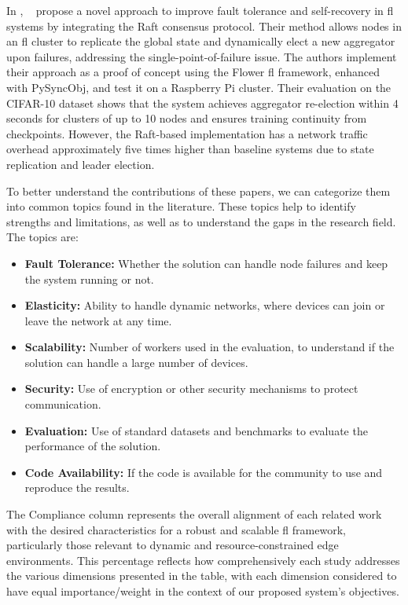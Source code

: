 In \cite{Dautov2024110}, ~\citeauthor{Dautov2024110} propose a novel approach to improve fault tolerance and self-recovery in \ac{fl} systems by integrating the Raft consensus protocol. Their method allows nodes in an \ac{fl} cluster to replicate the global state and dynamically elect a new aggregator upon failures, addressing the single-point-of-failure issue. The authors implement their approach as a proof of concept using the Flower \ac{fl} framework, enhanced with PySyncObj, and test it on a Raspberry Pi cluster. Their evaluation on the CIFAR-10 dataset shows that the system achieves aggregator re-election within 4 seconds for clusters of up to 10 nodes and ensures training continuity from checkpoints. However, the Raft-based implementation has a network traffic overhead approximately five times higher than baseline systems due to state replication and leader election.

To better understand the contributions of these papers, we can categorize them into common topics found in the literature. These topics help to identify strengths and limitations, as well as to understand the gaps in the research field. The topics are:

\begin{itemize}
    \item \textbf{Fault Tolerance:} Whether the solution can handle node failures and keep the system running or not.
    \item \textbf{Elasticity:} Ability to handle dynamic networks, where devices can join or leave the network at any time.
    \item \textbf{Scalability:} Number of workers used in the evaluation, to understand if the solution can handle a large number of devices.
    \item \textbf{Security:} Use of encryption or other security mechanisms to protect communication.
    \item \textbf{Evaluation:} Use of standard datasets and benchmarks to evaluate the performance of the solution.
    \item \textbf{Code Availability:} If the code is available for the community to use and reproduce the results.
\end{itemize}

The Compliance column represents the overall alignment of each related work with the desired characteristics for a robust and scalable \ac{fl} framework, particularly those relevant to dynamic and resource-constrained edge environments. This percentage reflects how comprehensively each study addresses the various dimensions presented in the table, with each dimension considered to have equal importance/weight in the context of our proposed system's objectives.


